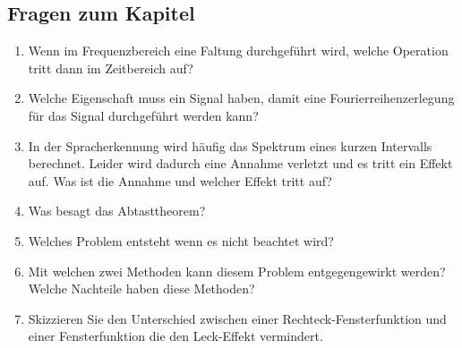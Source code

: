 \subsection{Fragen zum Kapitel}
\begin{enumerate}
	\item Wenn im Frequenzbereich eine Faltung durchgeführt wird, welche Operation tritt dann im Zeitbereich auf?
	\item Welche Eigenschaft muss ein Signal haben, damit eine Fourierreihenzerlegung für das Signal durchgeführt werden kann?

	\item In der Spracherkennung wird häufig das Spektrum eines kurzen Intervalls berechnet. Leider wird dadurch eine Annahme verletzt und es tritt ein Effekt auf. Was ist die Annahme und welcher Effekt tritt auf?
	\item Was besagt das Abtasttheorem?
	\item Welches Problem entsteht wenn es nicht beachtet wird?
	\item Mit welchen zwei Methoden kann diesem Problem entgegengewirkt werden? Welche Nachteile haben diese Methoden?
	\item Skizzieren Sie den Unterschied zwischen einer Rechteck-Fensterfunktion und einer Fensterfunktion die den Leck-Effekt vermindert.
\end{enumerate}

\textit{}